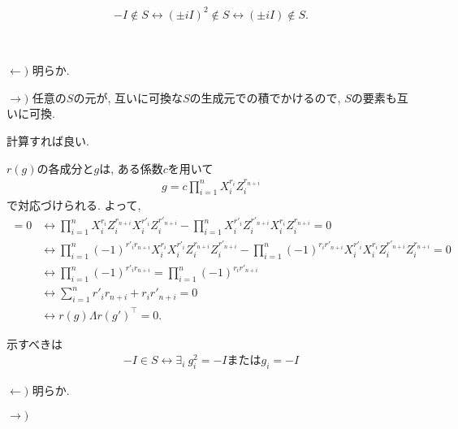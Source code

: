 \begin{ex}
    \label{ex10.30}
    \begin{align*}
        - I \notin S
        \longleftrightarrow
        (\pm i I)^2 \notin S
        \longleftrightarrow
        (\pm i I) \notin S.
    \end{align*}
\end{ex}

\begin{ex}
    \label{ex10.31}
    \ \par
    $\longleftarrow)$ 明らか.
    \par
    $\longrightarrow)$
    任意の$S$の元が, 互いに可換な$S$の生成元での積でかけるので, $S$の要素も互いに可換.
\end{ex}

\begin{ex}
    \label{ex10.32}
    計算すれば良い.
\end{ex}

\begin{ex}
    \label{ex10.33}
    $r(g)$の各成分と$g$は, ある係数$c$を用いて
    \begin{align*}
        g = c \prod_{i=1}^n X_i^{r_i} Z_i^{r_{n+i}}
    \end{align*}
    で対応づけられる. よって,
    \begin{align*}
        [g, g'] = 0
         & \longleftrightarrow
        \prod_{i = 1}^n X_i^{r_i}
        Z_i^{r_{n+i}} X_i^{r'_i} Z_i^{r'_{n+i}}
        -
        \prod_{i = 1}^n
        X_i^{r'_i} Z_i^{r'_{n+i}}X_i^{r_i} Z_i^{r_{n+i}}
        =0
        \\
         & \longleftrightarrow
        \prod_{i = 1}^n
        (-1)^{r'_i r_{n+i}} X_i^{r_i} X_i^{r'_i} Z_i^{r_{n+i}}  Z_i^{r'_{n+i}}
        -
        \prod_{i = 1}^n
        (-1)^{r_i r'_{n+i}} X_i^{r'_i} X_i^{r_i}Z_i^{r'_{n+i}} Z_i^{r_{n+i}}
        =0
        \\
         & \longleftrightarrow
        \prod_{i = 1}^n (-1)^{r'_i r_{n+i}} =
        \prod_{i = 1}^n (-1)^{r_i r'_{n+i}}
        \\
         & \longleftrightarrow
        \sum_{i=1}^n r'_i r_{n+i} + r_i r'_{n+i} = 0
        \\
         & \longleftrightarrow
        r(g) \Lambda r(g')^\top = 0.
    \end{align*}
\end{ex}

\begin{ex}
    \label{ex10.34}
    示すべきは
    \begin{align*}
        -I \in S
        \longleftrightarrow
        \exists_i \ g_i^2 = -I または g_i = -I
    \end{align*}
    \par
    $\longleftarrow)$ 明らか.
    \par
    $\longrightarrow)$
\end{ex}

